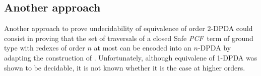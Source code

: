 \documentclass{article}
\newcommand{\encode}[1]{\ulcorner #1 \urcorner}
\newcommand{\nat}{\mathbb{N}}
\newcommand{\betared}{\rightarrow_\beta}
\newcommand\pcf{\textsl{PCF}}
\begin{document}
%
%
%

\subsection{Another approach}

Another approach to prove undecidability of equivalence of order
$2$-DPDA could consist in proving that the set of traversals of a
closed Safe \pcf\ term of ground type with redexes of order $n$ at
most can be encoded into an $n$-DPDA by adapting the construction of
\cite{KNU02}. Unfortunately, although equivalene of 1-DPDA was shown
to be decidable, it is not known whether it is the case at higher
orders.



\end{document}
